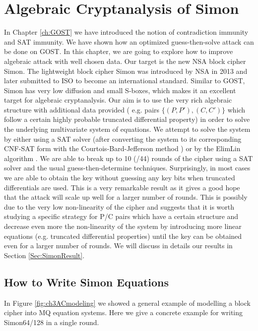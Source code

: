 \chapter{Algebraic Cryptanalysis of Simon}\label{ch:SIMON}
In Chapter \ref{ch:GOST} we have introduced the notion of contradiction immunity and SAT immunity. We have shown how an optimized guess-then-solve attack can be done on GOST. In this chapter, we are going to explore how to improve algebraic attack with well chosen data. Our target is the new NSA block cipher Simon\cite{NSAciphers}. The lightweight block cipher Simon was introduced by NSA in 2013 and later submitted to ISO to become an international standard. Similar to GOST, Simon has very low diffusion and small S-boxes, which makes it an excellent target for algebraic cryptanalysis. Our aim is to use the very rich algebraic structure
with additional data provided ( e.g. pairs $\{(P,P'),(C,C')\}$ which
follow a certain highly probable truncated differential property) in order to solve
the underlying multivariate system of equations. We attempt to solve the system
by either using a SAT solver (after converting the system to its corresponding
CNF-SAT form with the Courtois-Bard-Jefferson method \cite{BardCourtoiJeffersonConv}) or by the ElimLin algorithm \cite{FourMNL,OptimiPaper,OptimiPaper2}.
We are able to break up to 10 (/44) rounds of the cipher using
a SAT solver and the usual guess-then-determine techniques.
Surprisingly, in most cases we are
able to obtain the key without guessing any key bits
when truncated differentials are used.
This is a very remarkable result as it gives a good hope that the attack will scale up well for a larger number of rounds. This is possibly due to the very low non-linearity of the cipher and suggests that it is worth studying a specific strategy for P/C pairs which have a certain structure and decrease even more the non-linearity of the system by introducing
more linear equations (e.g. truncated differential properties)
until the key can be obtained even for a larger number of rounds. We will discuss in details our results in Section \ref{Sec:SimonResult}.


\section{How to Write Simon Equations}
In Figure \ref{fig:ch3ACmodeling} we showed a general example of modelling a block cipher into MQ equation systems. Here we give a concrete example for writing Simon64/128 in a single round.

